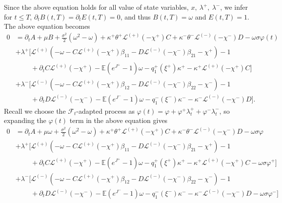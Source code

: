 \documentclass[11pt,a4paper]{article}
\numberwithin{equation}{section}
\theoremstyle{remark}
\theoremstyle{definition}
\newcommand{\E}{{\mathbb{E}}}
\begin{document}
Since the above equation holds for all value of state variables, $x,\ \lambda^+,\ \lambda^-$, we infer for $t \leq T$, $\partial_t B(t,T)=\partial_t E(t,T)=0$, and thus $B(t,T)=\omega$ and $E(t,T)=1$.
The above equation becomes
\begin{align*}
    0 & =\partial_t A+ \mu B + \frac{\sigma^2}{2}(\omega^2-\omega)+\kappa^+\theta^+\mathcal{L}^{(+)}(-\chi^+)C+\kappa^-\theta^-\mathcal{L}^{(-)}(-\chi^-)D - \omega\sigma\varphi(t) \\
    & +\lambda^{+}\Big[\mathcal{L}^{(+)}\left(-\omega-C \mathcal{L}^{(+)}\left(-\chi^{+}\right) \beta_{11}-D \mathcal{L}^{(-)}\left(-\chi^{-}\right) \beta_{21}- \chi^{+}\right)-1\\
    &\phantom{+\lambda^{+}\Big[} +\partial_t C\mathcal{L}^{(+)}(-\chi^+)
    -\E\left(e^{J^+}-1\right)\omega-q^+_1(\xi^+)\kappa^+-\kappa^+\mathcal{L}^{(+)}(-\chi^+)C
    \Big] \\
    & +\lambda^{-}\Big[\mathcal{L}^{(-)}\left(-\omega-C \mathcal{L}^{(+)}\left(-\chi^{+}\right) \beta_{12}-D \mathcal{L}^{(-)}\left(-\chi^{-}\right) \beta_{22}- \chi^{-}\right)-1\\
    &\phantom{+\lambda^{+}\Big[} +\partial_t D\mathcal{L}^{(-)}(-\chi^-)
    -\E\left(e^{J^-}-1\right)\omega-q^-_1(\xi^-)\kappa^--\kappa^-\mathcal{L}^{(-)}(-\chi^-)D
    \Big].
\end{align*}
Recall we choose the $\mathcal{F}_t$-adapted process as $\varphi(t)=\varphi+\varphi^+\lambda^+_t+\varphi^-\lambda^-_t$, so expanding the $\varphi(t)$ term in the above equation gives
\begin{align*}
    0 & =\partial_t A+ \mu \omega + \frac{\sigma^2}{2}(\omega^2-\omega)+\kappa^+\theta^+\mathcal{L}^{(+)}(-\chi^+)C+\kappa^-\theta^-\mathcal{L}^{(-)}(-\chi^-)D - \omega\sigma\varphi\\
    & +\lambda^{+}\big[\mathcal{L}^{(+)}\left(-\omega-C \mathcal{L}^{(+)}\left(-\chi^{+}\right) \beta_{11}-D \mathcal{L}^{(-)}\left(-\chi^{-}\right) \beta_{21}-\chi^{+}\right)-1\\
    &\phantom{+\lambda^{+}\Big[}+\partial_tC\mathcal{L}^{(+)}(-\chi^+)
    -\E\left(e^{J^+}-1\right)\omega-q^+_1(\xi^+)\kappa^+-\kappa^+\mathcal{L}^{(+)}(-\chi^+)C
    - \omega\sigma\varphi^+
    \big] \\
    & +\lambda^{-}\big[\mathcal{L}^{(-)}\left(-\omega-C \mathcal{L}^{(+)}\left(-\chi^{+}\right) \beta_{12}-D \mathcal{L}^{(-)}\left(-\chi^{-}\right) \beta_{22}-\chi^{-}\right)-1\\
    &\phantom{+\lambda^{+}\Big[}+\partial_tD\mathcal{L}^{(-)}(-\chi^-)
    -\E\left(e^{J^-}-1\right)\omega-q^-_1(\xi^-)\kappa^--\kappa^-\mathcal{L}^{(-)}(-\chi^-)D
    - \omega\sigma\varphi^-
    \big]
\end{align*}
\end{document}
